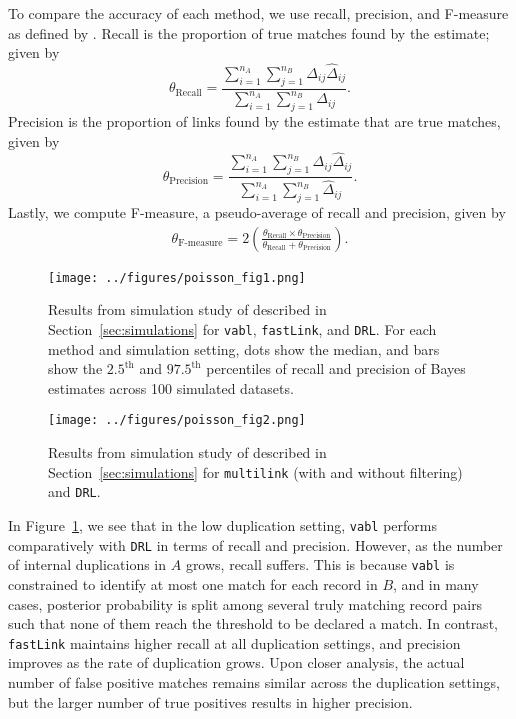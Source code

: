 \documentclass[12pt,letterpaper]{article}
\newcommand{\1}[1]{\mathbb{I}\!\left[#1\right]} %
\begin{document}
To compare the accuracy of each method, we use recall, precision, and F-measure as defined by \cite{christen_data_2012}. Recall is the proportion of true matches found by the estimate; given by
$$\theta_{\text{Recall}} = \frac{\sum_{i=1}^{n_A}\sum_{j=1}^{n_B} \Delta_{ij} \hat{\Delta}_{ij}}{\sum_{i=1}^{n_A}\sum_{j=1}^{n_B} \Delta_{ij}}.$$
Precision is the proportion of links found by the estimate that are true matches, given by
$$\theta_{\text{Precision}} = \frac{\sum_{i=1}^{n_A}\sum_{j=1}^{n_B}\Delta_{ij}\hat{\Delta}_{ij}}{\sum_{i=1}^{n_A}\sum_{j=1}^{n_B} \hat{\Delta}_{ij}}.$$
Lastly, we compute F-measure, a pseudo-average of recall and precision, given by 
\begin{align*}
	\theta_{\text{F-measure}} = 2 \left(\frac{\theta_{\text{Recall}} \times \theta_{\text{Precision}}}{\theta_{\text{Recall}} +  \theta_{\text{Precision}}}\right).
\end{align*}

\begin{figure}[t]
	\centering
	\texttt{[image: ../figures/poisson\_fig1.png]}
	\caption{Results from simulation study of described in Section~\ref{sec:simulations} for \texttt{vabl}, \texttt{fastLink}, and \texttt{DRL}. For each method and simulation setting, dots show the median, and bars show the $2.5^{\text{th}}$ and $97.5^{\text{th}}$ percentiles of recall and precision of Bayes estimates across 100 simulated datasets.}
	\label{fig:sim-vabl-comparison}
\end{figure}

\begin{figure}
	\centering
	\texttt{[image: ../figures/poisson\_fig2.png]}
	\caption{Results from simulation study of described in Section~\ref{sec:simulations} for \texttt{multilink} (with and without filtering) and \texttt{DRL}.}
	\label{fig:sim-multilink-comparison}
\end{figure}

In Figure~\ref{fig:sim-vabl-comparison}, we see that in the low duplication setting, \texttt{vabl} performs comparatively with \texttt{DRL} in terms of recall and precision. However, as the number of internal duplications in $A$ grows, recall suffers. This is because \texttt{vabl} is constrained to identify at most one match for each record in $B$, and in many cases, posterior probability is split among several truly matching record pairs such that none of them reach the threshold to be declared a match. In contrast, \texttt{fastLink} maintains higher recall at all duplication settings, and precision improves as the rate of duplication grows. Upon closer analysis, the actual number of false positive matches remains similar across the duplication settings, but the larger number of true positives results in higher precision. 
\end{document}
